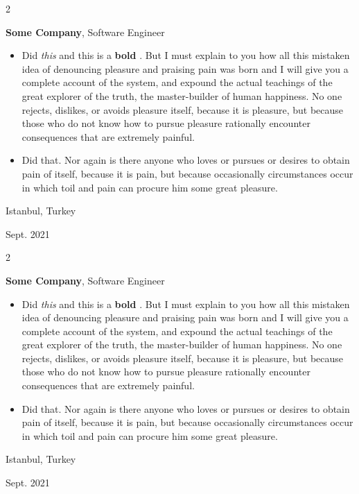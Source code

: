 \documentclass[10pt, letterpaper]{article}
\newenvironment{highlights}{
    \begin{itemize}[
        topsep=0.10 cm,
        parsep=0.10 cm,
        partopsep=0pt,
        itemsep=0pt,
        leftmargin=0.4 cm + 10pt
    ]
}{
    \end{itemize}
} %
\newenvironment{twocolentry}[2][]{
    \onecolentry
    \def\secondColumn{#2}
    \setcolumnwidth{\fill, 4.5 cm}
    \begin{paracol}{2}
}{
    \switchcolumn \raggedleft \secondColumn
    \end{paracol}
    \endonecolentry
} %
\let\hrefWithoutArrow\href
\renewcommand{\href}[2]{\hrefWithoutArrow{#1}{\mbox{\ifthenelse{\equal{#2}{}}{ }{#2 }\raisebox{.15ex}{\footnotesize \faExternalLink*}}}}
\begin{document}
        \begin{twocolentry}{
            Istanbul, Turkey

        Sept. 2021
        }
            \textbf{Some \textnormal{Company}}, Software Engineer
            \begin{highlights}
                \item Did \textit{this} and this is a \textbf{bold} \href{https://example.com}{link}. But I must explain to you how all this mistaken idea of denouncing pleasure and praising pain was born and I will give you a complete account of the system, and expound the actual teachings of the great explorer of the truth, the master-builder of human happiness. No one rejects, dislikes, or avoids pleasure itself, because it is pleasure, but because those who do not know how to pursue pleasure rationally encounter consequences that are extremely painful.
                \item Did that. Nor again is there anyone who loves or pursues or desires to obtain pain of itself, because it is pain, but because occasionally circumstances occur in which toil and pain can procure him some great pleasure.
            \end{highlights}
        \end{twocolentry}


        \vspace{0.2 cm}

        \begin{twocolentry}{
            Istanbul, Turkey

        Sept. 2021
        }
            \textbf{Some \textnormal{Company}}, Software Engineer
            \begin{highlights}
                \item Did \textit{this} and this is a \textbf{bold} \href{https://example.com}{link}. But I must explain to you how all this mistaken idea of denouncing pleasure and praising pain was born and I will give you a complete account of the system, and expound the actual teachings of the great explorer of the truth, the master-builder of human happiness. No one rejects, dislikes, or avoids pleasure itself, because it is pleasure, but because those who do not know how to pursue pleasure rationally encounter consequences that are extremely painful.
                \item Did that. Nor again is there anyone who loves or pursues or desires to obtain pain of itself, because it is pain, but because occasionally circumstances occur in which toil and pain can procure him some great pleasure.
            \end{highlights}
        \end{twocolentry}
\end{document}
